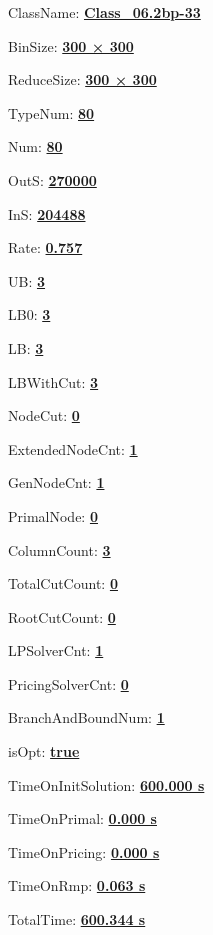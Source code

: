 \documentclass[11pt]{article}
\begin{document}
\pagestyle{empty}


ClassName: \underline{\textbf{Class_06.2bp-33}}
\par
BinSize: \underline{\textbf{300 × 300}}
\par
ReduceSize: \underline{\textbf{300 × 300}}
\par
TypeNum: \underline{\textbf{80}}
\par
Num: \underline{\textbf{80}}
\par
OutS: \underline{\textbf{270000}}
\par
InS: \underline{\textbf{204488}}
\par
Rate: \underline{\textbf{0.757}}
\par
UB: \underline{\textbf{3}}
\par
LB0: \underline{\textbf{3}}
\par
LB: \underline{\textbf{3}}
\par
LBWithCut: \underline{\textbf{3}}
\par
NodeCut: \underline{\textbf{0}}
\par
ExtendedNodeCnt: \underline{\textbf{1}}
\par
GenNodeCnt: \underline{\textbf{1}}
\par
PrimalNode: \underline{\textbf{0}}
\par
ColumnCount: \underline{\textbf{3}}
\par
TotalCutCount: \underline{\textbf{0}}
\par
RootCutCount: \underline{\textbf{0}}
\par
LPSolverCnt: \underline{\textbf{1}}
\par
PricingSolverCnt: \underline{\textbf{0}}
\par
BranchAndBoundNum: \underline{\textbf{1}}
\par
isOpt: \underline{\textbf{true}}
\par
TimeOnInitSolution: \underline{\textbf{600.000 s}}
\par
TimeOnPrimal: \underline{\textbf{0.000 s}}
\par
TimeOnPricing: \underline{\textbf{0.000 s}}
\par
TimeOnRmp: \underline{\textbf{0.063 s}}
\par
TotalTime: \underline{\textbf{600.344 s}}
\par
\newpage
\end{document}
